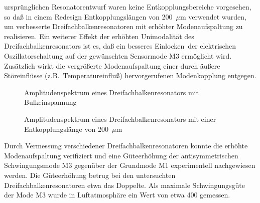 ursprünglichen Resonatorentwurf waren keine Entkopplungsbereiche vorgesehen,
so daß in einem Redesign Entkopplungslängen von 200~$\mu$m verwendet wurden,
um verbesserte Dreifachbalkenresonatoren mit erhöhter Modenaufspaltung zu
realisieren.
Ein weiterer Effekt der erhöhten Unimodalität des Dreifachbalkenresonators
ist es, daß ein besseres \glqq Einlocken\grqq \, der elektrischen
Oszillatorschaltung auf der gewünschten Sensormode M3 ermöglicht wird.
Zusätzlich wirkt die vergrößerte Modenaufspaltung einer durch äußere
Störeinflüsse (z.B.\ Temperatureinfluß) hervorgerufenen Modenkopplung
entgegen.\\
\begin{figure}[ht]
\begin{minipage}[t]{7cm}

\vspace*{0.25cm}
\begin{center}

\setabbsv
\end{center}
\caption{\label{abbmodenkoppl1}
 Amplitudenspektrum eines Dreifachbalkenresonators mit Bulkeinspannung}
\end{minipage}
\hfill
\begin{minipage}[t]{7cm}
\vspace*{0.25cm}
\begin{center}

\setabbsf
\end{center}
\caption{\label{abbmodenkoppl2}
 Amplitudenspektrum eines Dreifachbalkenresonators mit einer
 Entkopplungslänge von 200~$\mu$m}
\end{minipage}
\end{figure}
Durch Vermessung verschiedener Dreifachbalkenresonatoren konnte die erhöhte
Modenaufspaltung verifiziert und eine Güteerhöhung der antisymmetrischen
Schwingungsmode M3 gegenüber der Grundmode M1 experimentell nachgewiesen
werden. Die Güteerhöhung betrug bei den untersuchten
Dreifachbalkenresonatoren etwa das Doppelte. Als maximale Schwingungsgüte
der Mode M3 wurde in Luftatmosphäre ein Wert von etwa 400 gemessen.
